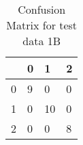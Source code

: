 

\begin{table}[]
    \centering
    
        \begin{tabular}{|l|l|l|l|}
            \hline
            &0&1&2\\
            \hline
            0&9&0&0\\
            \hline
            1&0&10&0\\
            \hline
            2&0&0&8\\
            \hline
 \end{tabular}

\caption{Confusion Matrix for test data 1B}
    \label{tab:conf_train1b}
\end{table}